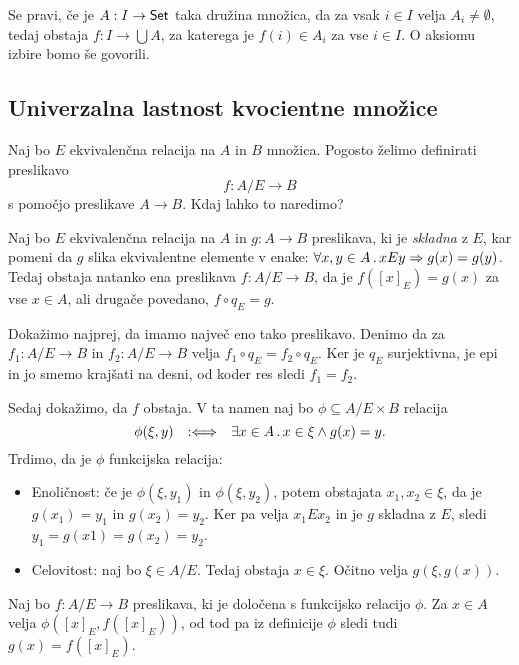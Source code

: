 Se pravi, če je $A : I \to \mathsf{Set}$ taka družina množica, da za vsak $i \in I$ velja $A_i \neq \emptyset$,
tedaj obstaja $f : I \to \bigcup A$, za katerega je $f(i) \in A_i$ za vse $i \in I$.
%
O aksiomu izbire bomo še govorili.


\subsection{Univerzalna lastnost kvocientne množice}

Naj bo $E$ ekvivalenčna relacija na $A$ in $B$ množica. Pogosto želimo definirati
preslikavo
%
\begin{equation*}
    f : A/E \to B
\end{equation*}
%
s pomočjo preslikave $A \to B$. Kdaj lahko to naredimo?

\begin{izrek}
  Naj bo $E$ ekvivalenčna relacija na $A$ in $g : A \to B$ preslikava, ki je \emph{skladna} z $E$, kar pomeni da $g$
  slika ekvivalentne elemente v enake: $\forall x, y \in A \,.\, x E y \Rightarrow g(x) = g(y)$. Tedaj obstaja natanko ena
  preslikava $f : A/E \to B$, da je $f([x]_E) = g(x)$ za vse $x \in A$, ali drugače povedano, $f \circ q_E = g$.
\end{izrek}

\begin{dokaz}
  Dokažimo najprej, da imamo največ eno tako preslikavo. Denimo da za $f_1 : A/E \to B$ in
  $f_2 : A/E \to B$ velja $f_1 \circ q_E = f_2 \circ q_E$. Ker je $q_E$ surjektivna, je epi in jo smemo
  krajšati na desni, od koder res sledi $f_1 = f_2$.

  Sedaj dokažimo, da $f$ obstaja. V ta namen naj bo $\phi \subseteq A/E \times B$ relacija
  \begin{equation*}
    \phi(\xi, y) \quad {{:}{\Longleftrightarrow}}\quad \exists x \in A \,.\, x \in \xi \land g(x) = y.
  \end{equation*}
  Trdimo, da je $\phi$ funkcijska relacija:
  \begin{itemize}
  \item
    Enoličnost: če je $\phi(\xi, y_1)$ in $\phi(\xi, y_2)$, potem obstajata $x_1, x_2 \in \xi$, da je $g(x_1) = y_1$
    in $g(x_2) = y_2$. Ker pa velja $x_1 E x_2$ in je $g$ skladna z $E$, sledi $y_1 = g(x1) = g(x_2) = y_2$.

  \item  Celovitost: naj bo $\xi \in A/E$. Tedaj obstaja $x \in \xi$. Očitno velja $g(\xi, g(x))$.
  \end{itemize}
  Naj bo $f : A/E \to B$ preslikava, ki je določena s funkcijsko relacijo $\phi$. Za $x \in A$
  velja $\phi([x]_E, f([x]_E))$, od tod pa iz definicije $\phi$ sledi tudi $g(x) = f([x]_E)$.
\end{dokaz}

